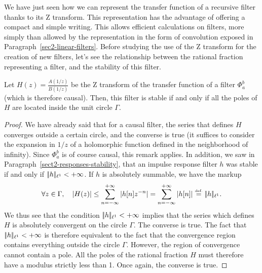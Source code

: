  
We have just seen how we can represent the transfer function of a recursive filter thanks to its Z transform. This representation has the advantage of offering a compact and simple writing. This allows efficient calculations on filters, more simply than allowed by the representation in the form of convolution exposed in Paragraph~\ref{sec2-linear-filters}. Before studying the use of the Z transform for the creation of new filters, let's see the relationship between the rational fraction representing a filter, and the stability of this filter.
 
\begin{prop}
\label{prop-poles-stability}
  Let $ H (z) = \frac{A (1 / z)}{B (1 / z)} $ be the Z transform of the transfer function of a filter $ \Phi_a^b $ (which is therefore causal). Then, this filter is stable if and only if all the poles of $ H $ are located inside the unit circle $ \Gamma $.
\end{prop}
\begin{proof}
  We have already said that for a causal filter, the series that defines $ H $ converges outside a certain circle, and the converse is true (it suffices to consider the expansion in $ 1 / z $ of a holomorphic function defined in the neighborhood of infinity). Since $ \Phi_a^b $ is of course causal, this remark applies. In addition, we saw in Paragraph~\ref{sect2-responses-stability}, that an impulse response filter $ h $ was stable if and only if $ |\!| h |\!|_{\ell^1} <+ \infty $. If $ h $ is absolutely summable, we have the markup
\begin{equation*}
\forall z \in \Gamma, \quad | H (z) | \leq \sum_{n = -\infty}^{+\infty}{| h [n] z^{- n} | } = \sum_{n = -\infty}^{+\infty}{| h [n] | } \stackrel{\mbox{\upshape\tiny def.}}{=} |\!| h |\!|_{\ell^1}.
\end{equation*}
We thus see that the condition $ |\!| h |\!|_{\ell^1} <+ \infty $ implies that the series which defines $ H $ is absolutely convergent on the circle $ \Gamma $. The converse is true. The fact that $ |\!| h |\!|_{\ell^1} <+ \infty $ is therefore equivalent to the fact that the convergence region contains everything outside the circle $ \Gamma $. However, the region of convergence cannot contain a pole. All the poles of the rational fraction $ H $ must therefore have a modulus strictly less than 1. Once again, the converse is true.
\end{proof}
 
